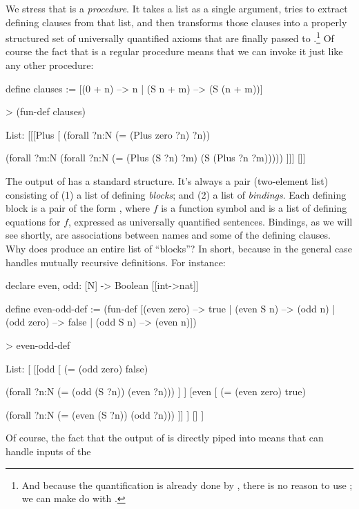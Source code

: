 We stress that  is a {\em procedure}. It takes a list 
as a single argument, tries to extract defining clauses from that 
list, and then transforms those clauses into a properly structured
set of universally quantified axioms that are finally passed to 
.\footnote{And because the quantification is already
done by , there is no reason to use ; we 
can make do with .} Of course the fact that 
is a regular procedure means that we can invoke it just like any
other procedure: 
\begin{tcAthena}
define clauses := [(0 + n) --> n
                 | (S n + m) --> (S (n + m))]

> (fun-def clauses)

List: [[[Plus [
(forall ?n:N
  (= (Plus zero ?n)
     ?n))
 
(forall ?m:N
  (forall ?n:N
    (= (Plus (S ?n)
             ?m)
       (S (Plus ?n ?m)))))
]]] []]
\end{tcAthena}
The output of  has a standard structure. It's always a pair (two-element list)
consisting of (1) a list of defining {\em blocks}; and (2) a list of {\em bindings}. 
Each defining block is a pair of the form \mtt{[$f$ [$p_1 \cdots p_{k_f}$]]}, where
$f$ is a function symbol and \mtt{[$p_1 \cdots p_{k_f}$]} is a list of defining
equations for $f$, expressed as universally quantified sentences. 
Bindings, as we will see shortly, are associations between names 
and some of the defining clauses. Why does  produce an entire 
list of ``blocks''?  In short, because in the general case  
handles mutually recursive definitions. For instance:
\begin{tcAthena}
declare even, odd: [N] -> Boolean [[int->nat]]

define even-odd-def := 
  (fun-def [(even zero) --> true
          | (even S n) --> (odd n)
          | (odd zero) --> false
          | (odd S n) --> (even n)])

> even-odd-def

List:
[
[[odd [
(= (odd zero)
   false)
 
(forall ?n:N
  (= (odd (S ?n))
     (even ?n)))
      ]
]
[even [
(= (even zero)
   true)
 
(forall ?n:N
  (= (even (S ?n))
     (odd ?n)))
]]
]
  []
]
\end{tcAthena}
Of course, the fact that the output of  is directly piped
into  means that  can handle inputs of the
